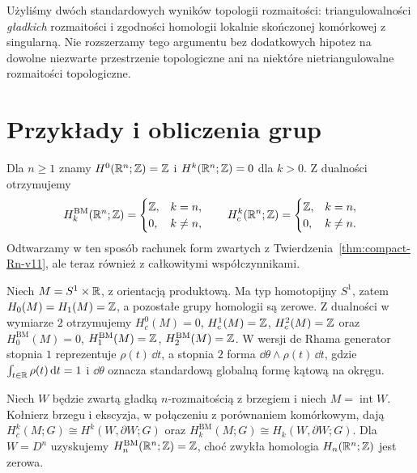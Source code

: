 \begin{uwaga}
Użyliśmy dwóch standardowych wyników topologii
rozmaitości: triangulowalności \emph{gładkich}
rozmaitości i zgodności homologii lokalnie
skończonej komórkowej z singularną. Nie rozszerzamy
tego argumentu bez dodatkowych hipotez na dowolne
niezwarte przestrzenie topologiczne ani na
niektóre nietriangulowalne rozmaitości topologiczne.
\end{uwaga}

\section{Przykłady i obliczenia grup}
\begin{przyklad}
Dla $n\ge1$ znamy $H^0(\mathbb{R}^n;\mathbb{Z})=\mathbb{Z}$ i
$H^k(\mathbb{R}^n;\mathbb{Z})=0$ dla $k>0$.
Z dualności otrzymujemy
\[
H_k^{\mathrm{BM}}(\mathbb{R}^n;\mathbb{Z})=
\begin{cases}\mathbb{Z},&k=n,\\0,&k\ne n,\end{cases}
\qquad
H_c^k(\mathbb{R}^n;\mathbb{Z})=
\begin{cases}\mathbb{Z},&k=n,\\0,&k\ne n.\end{cases}
\]
Odtwarzamy w ten sposób rachunek form zwartych
z Twierdzenia~\ref{thm:compact-Rn-v11},
ale teraz również z całkowitymi współczynnikami.
\end{przyklad}

\begin{przyklad}
Niech $M=S^1\times\mathbb{R}$, z orientacją produktową.
Ma typ homotopijny $S^1$, zatem $H_0(M)=H_1(M)=\mathbb{Z}$,
a pozostałe grupy homologii są zerowe.
Z dualności w wymiarze $2$ otrzymujemy
$H_c^0(M)=0$, $H_c^1(M)=\mathbb{Z}$, $H_c^2(M)=\mathbb{Z}$ oraz
$H_0^{\mathrm{BM}}(M)=0$, $H_1^{\mathrm{BM}}(M)=\mathbb{Z}$,
$H_2^{\mathrm{BM}}(M)=\mathbb{Z}$.
W wersji de Rhama generator stopnia $1$ reprezentuje
$\rho(t)\,\dd t$, a stopnia $2$ forma
$\dd\theta\wedge\rho(t)\,\dd t$, gdzie
$\int_{t\in\mathbb{R}}\rho(t)\,\mathrm d t=1$ i $\dd\theta$ oznacza
standardową globalną formę kątową na okręgu.
\end{przyklad}

\begin{przyklad}
Niech $W$ będzie zwartą gładką $n$-rozmaitością
z brzegiem i niech $M=\operatorname{int}W$.
Kołnierz brzegu i ekscyzja, w połączeniu z
porównaniem komórkowym, dają
$H_c^k(M;G)\cong H^k(W,\partial W;G)$ oraz
$H_k^{\mathrm{BM}}(M;G)\cong H_k(W,\partial W;G)$.
Dla $W=D^n$ uzyskujemy
$H_n^{\mathrm{BM}}(\mathbb{R}^n;\mathbb{Z})=\mathbb{Z}$,
choć zwykła homologia $H_n(\mathbb{R}^n;\mathbb{Z})$ jest zerowa.
\end{przyklad}


